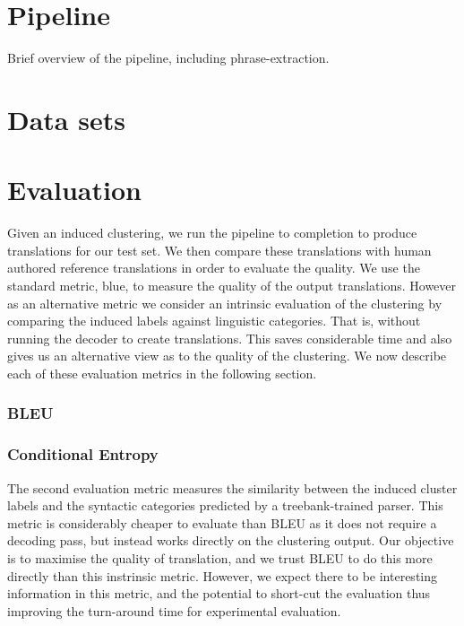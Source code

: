 \section{Pipeline}

Brief overview of the pipeline, including phrase-extraction.

\section{Data sets}

\section{Evaluation}

Given an induced clustering, we run the pipeline to completion to produce translations for our test set. We then compare these translations with human authored reference translations in order to evaluate the quality. We use the standard metric, blue, to measure the quality of the output translations. However as an alternative metric we consider an intrinsic evaluation of the clustering by comparing the induced labels against linguistic categories. That is, without running the decoder to create translations. This saves considerable time and also gives us an alternative view as to the quality of the clustering. We now describe each of these evaluation metrics in the following section.

\subsubsection{BLEU}


\subsubsection{Conditional Entropy}

The second evaluation metric measures the similarity between the induced cluster labels and the syntactic categories predicted by a treebank-trained parser. This metric is considerably cheaper to evaluate than BLEU as it does not require a decoding pass, but instead works directly on the clustering output. Our objective is to maximise the quality of translation, and we trust BLEU to do this more directly than this instrinsic metric. However, we expect there to be interesting information in this metric, and the potential to short-cut the evaluation thus improving the turn-around time for experimental evaluation. 

